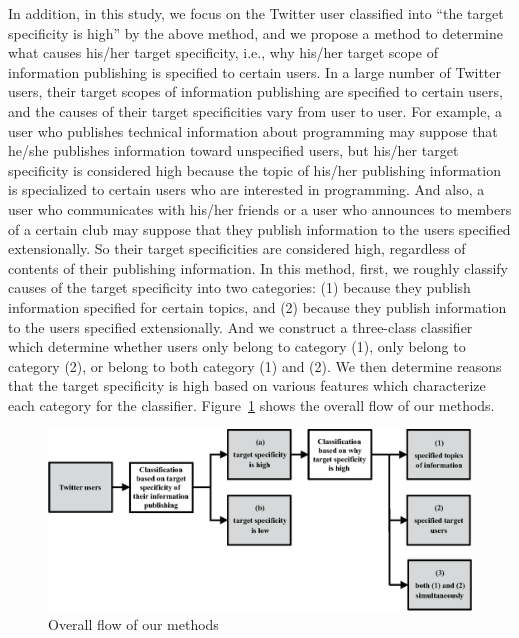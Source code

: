 In addition, in this study, we focus on the Twitter user classified into
``the target specificity is high'' by the above method, and we propose a
method to determine what causes his/her target specificity, i.e., why
his/her target scope of information publishing is specified to certain
users.  In a large number of Twitter users, their target scopes of
information publishing are specified to certain users, and the causes of
their target specificities vary from user to user.  For example, a user
who publishes technical information about programming may suppose that
he/she publishes information toward unspecified users, but his/her
target specificity is considered high because the topic of his/her
publishing information is specialized to certain users who are
interested in programming.  And also, a user who communicates with
his/her friends or a user who announces to members of a certain club may
suppose that they publish information to the users specified
extensionally. So their target specificities are considered high,
regardless of contents of their publishing information.  In this method,
first, we roughly classify causes of the target specificity into two
categories: (1) because they publish information specified for certain
topics, and (2) because they publish information to the users specified
extensionally. And we construct a three-class classifier which determine
whether users only belong to category (1), only belong to category (2),
or belong to both category (1) and (2).  We then determine reasons that
the target specificity is high based on various features which
characterize each category for the classifier.  Figure~\ref{fig:Flow}
shows the overall flow of our methods.

{\footnotesize
\begin{figure}[t]
\begin{center}
\includegraphics[width=14cm]{images/flow.eps}
 \caption{Overall flow of our methods}
\label{fig:Flow}
\end{center}
\end{figure}
}

